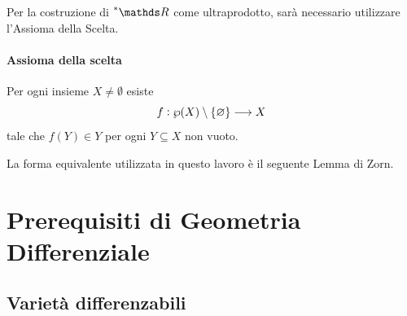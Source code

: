 Per la costruzione di $ \starR $ come ultraprodotto, sarà necessario utilizzare l'Assioma della Scelta. 

\paragraph{Assioma della scelta} Per ogni insieme $ X\neq \emptyset $ esiste \[f:\wp (X)\setminus\{\varnothing\}\longrightarrow X\]tale che $ f(Y) \in Y $ per ogni $ Y \subseteq X $ non vuoto.

La forma equivalente utilizzata in questo lavoro è il seguente Lemma di Zorn.



\section{Prerequisiti di Geometria Differenziale}\label{sec:geodiff}

\subsection{Varietà differenzabili}

